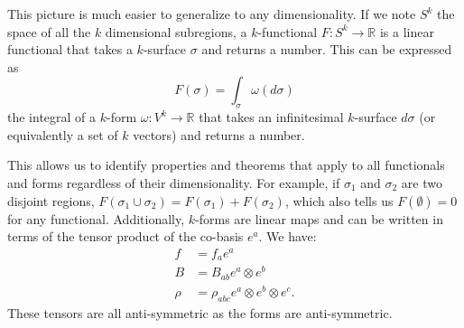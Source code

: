 \documentclass[10pt,twocolumn, nofootinbib]{revtex4-2}
\begin{document}
This picture is much easier to generalize to any dimensionality. If we note $S^k$ the space of all the $k$ dimensional subregions, a $k$-functional $F : S^k \to \mathbb{R}$ is a linear functional that takes a $k$-surface $\sigma$ and returns a number. This can be expressed as
\begin{equation*}
	F(\sigma) = \int_\sigma \omega(d\sigma)
\end{equation*}
the integral of a $k$-form $\omega : V^k \to \mathbb{R}$ that takes an infinitesimal $k$-surface $d\sigma$ (or equivalently a set of $k$ vectors) and returns a number.

This allows us to identify properties and theorems that apply to all functionals and forms regardless of their dimensionality. For example, if $\sigma_1$ and $\sigma_2$ are two disjoint regions, $F(\sigma_1 \cup \sigma_2) = F(\sigma_1) + F(\sigma_2)$, which also tells us $F(\emptyset) = 0$ for any functional. Additionally, $k$-forms are linear maps and can be written in terms of the tensor product of the co-basis $e^a$. We have:
\begin{equation*}
	\begin{aligned}
		f &= f_a e^a \\
		B &= B_{ab} e^a \otimes e^b \\
		\rho &= \rho_{abc} e^a \otimes e^b \otimes e^c.
	\end{aligned}
\end{equation*}
These tensors are all anti-symmetric as the forms are anti-symmetric.











\end{document}
